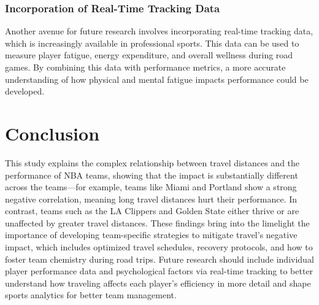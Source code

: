 \documentclass[12pt]{article}
\begin{document}
\subsubsection{Incorporation of Real-Time Tracking Data}
Another avenue for future research involves incorporating real-time tracking data, which is increasingly available in professional sports. This data can be used to measure player fatigue, energy expenditure, and overall wellness during road games. By combining this data with performance metrics, a more accurate understanding of how physical and mental fatigue impacts performance could be developed.


\section{Conclusion}
This study explains the complex relationship between travel distances and the performance of NBA teams, showing that the impact is substantially different across the teams—for example, teams like Miami and Portland show a strong negative correlation, meaning long travel distances hurt their performance. In contrast, teams such as the LA Clippers and Golden State either thrive or are unaffected by greater travel distances. These findings bring into the limelight the importance of developing team-specific strategies to mitigate travel's negative impact, which includes optimized travel schedules, recovery protocols, and how to foster team chemistry during road trips. Future research should include individual player performance data and psychological factors via real-time tracking to better understand how traveling affects each player's efficiency in more detail and shape sports analytics for better team management.
\end{document}
